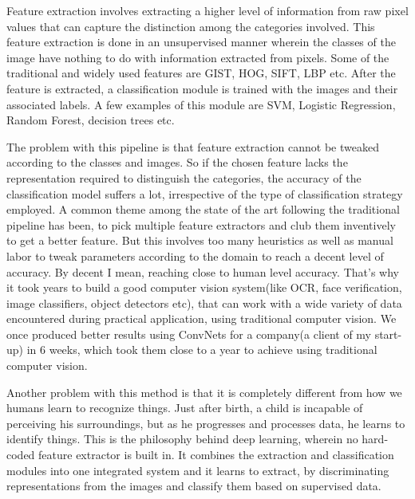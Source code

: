 \documentclass[../main.tex]{subfiles}
\begin{document}
\label{capitolo6}
\thispagestyle{empty}

Feature extraction involves extracting a higher level of information from raw pixel values that can capture the distinction among the categories involved. This feature extraction is done in an unsupervised manner wherein the classes of the image have nothing to do with information extracted from pixels. Some of the traditional and widely used features are GIST, HOG, SIFT, LBP etc. After the feature is extracted, a classification module is trained with the images and their associated labels. A few examples of this module are SVM, Logistic Regression, Random Forest, decision trees etc.

The problem with this pipeline is that feature extraction cannot be tweaked according to the classes and images. So if the chosen feature lacks the representation required to distinguish the categories, the accuracy of the classification model suffers a lot, irrespective of the type of classification strategy employed. A common theme among the state of the art following the traditional pipeline has been, to pick multiple feature extractors and club them inventively to get a better feature. But this involves too many heuristics as well as manual labor to tweak parameters according to the domain to reach a decent level of accuracy. By decent I mean, reaching close to human level accuracy. That’s why it took years to build a good computer vision system(like OCR, face verification, image classifiers, object detectors etc), that can work with a wide variety of data encountered during practical application, using traditional computer vision. We once produced better results using ConvNets for a company(a client of my start-up) in 6 weeks, which took them close to a year to achieve using traditional computer vision. 

Another problem with this method is that it is completely different from how we humans learn to recognize things. Just after birth, a child is incapable of perceiving his surroundings, but as he progresses and processes data, he learns to identify things. This is the philosophy behind deep learning, wherein no hard-coded feature extractor is built in. It combines the extraction and classification modules into one integrated system and it learns to extract, by discriminating representations from the images and classify them based on supervised data.
\end{document}
